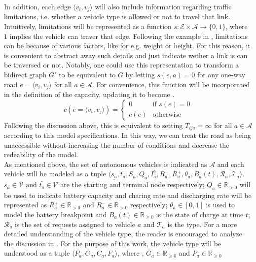 In addition, each edge $\langle v_i, v_j \rangle$ will also include information regarding traffic limitations, i.e. whether a vehicle type is allowed or not to travel that link. Intuitively, limitations will be represented as a function $s: \mathcal{E} \times \mathcal{A} \rightarrow\{0,1\}$, where $1$ implies the vehicle can traver that edge. Following the example in \cite{project_thesis}, limitations can be because of various factors, like for e.g. weight or height. For this reason, it is convenient to abstract away such details and just indicate wether a link is can be traversed or not. Notably, one could use this representation to transform a bidirect graph $G'$ to be equivalent to $G$ by letting $s(e,a) = 0$ for any one-way road $e = \langle v_i, v_j \rangle$ for all $a \in \mathcal{A}$. For convenience, this function will be incorporated in the definition of the capacity, updating it to become . 
\begin{equation}
	c(e = \langle v_i, v_j \rangle) = 
	\begin{cases}
		0 & \text{if } s(e) = 0 \\
		c(e) & \text{otherwise}
	\end{cases}
	\label{eq:capacity}
\end{equation}
Following the discussion above, this is equivalent to setting $T_{ija} = \infty$ for all $a \in \mathcal{A}$ according to this model specifications. In this way, we can treat the road as being unaccessible without increasing the number of conditions and decrease the redeability of the model. \\
As mentioned above, the set of autonomous vehicles is indicated as $\mathcal{A}$ and each vehicle will be modeled as a tuple $\langle \underline{s_a},\bar{t_a}, S_a, Q_a, I^b_a, R^-_a, R^+_a, \theta_a, B_a(t),\mathcal{R}_a, \mathcal{T}_a \rangle$. $\underline{s_a}\in \mathcal{V} \text{ and } \bar{t_a}\in \mathcal{V}$ are the starting and terminal node respectively; $Q_a \in \mathbb{R}_{>0}$ will be used to indicate battery capacity and charing rate and discharging rate will be represented as  $R^+_a \in \mathbb{R}_{>0}\text{ and } R^-_a\in \mathbb{R}_{>0}$ respectively; $\theta_a \in [0,1]$ is used to model the battery breakpoint and $B_a(t)\in \mathbb{R}_{\ge0}$ is the state of charge at time $t$; $\mathcal{R}_a$ is the set of requests assigned to vehicle $a$ and $\mathcal{T}_a$ is the type. For a more detailed understanding of the vehicle type, the reader is encouraged to analyze the discussion in \cite{project_thesis}. For the purpose of this work, the vehicle type will be understood as a tuple $\langle P_a, G_a, C_a, F_a \rangle$, where , $G_a \in \mathbb{R}_{\ge0}$ and $P_a \in \mathbb{R}_{\ge0}$
